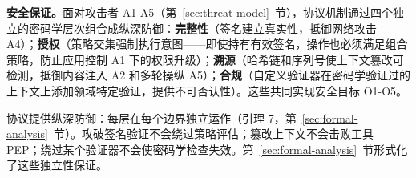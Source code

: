 
\noindent\textbf{安全保证。}面对攻击者 A1-A5（第~\ref{sec:threat-model}~节），协议机制通过四个独立的密码学层次组合成纵深防御：\textbf{完整性}（签名建立真实性，抵御网络攻击 A4）；\textbf{授权}（策略交集强制执行意图——即使持有有效签名，操作也必须满足组合策略，防止应用控制 A1 下的权限升级）；\textbf{溯源}（哈希链和序列号使上下文篡改可检测，抵御内容注入 A2 和多轮操纵 A5）；\textbf{合规}（自定义验证器在密码学验证过的上下文上添加领域特定验证，提供不可否认性）。这些共同实现安全目标 O1-O5。

协议提供纵深防御：每层在每个边界独立运作（引理 7，第~\ref{sec:formal-analysis}~节）。攻破签名验证不会绕过策略评估；篡改上下文不会击败工具 PEP；绕过某个验证器不会使密码学检查失效。第~\ref{sec:formal-analysis}~节形式化了这些独立性保证。
